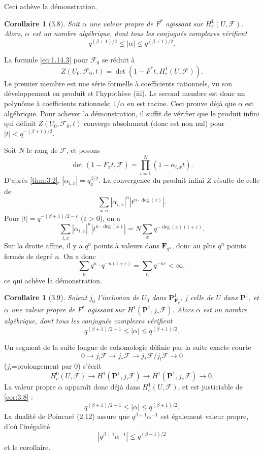 \documentclass[12pt,a4paper]{amsart}
\theoremstyle{plain}
\newtheorem{corollaire}[theoreme]{Corollaire}
\theoremstyle{definition}
\theoremstyle{remark}
\newcommand{\F}{\mathbf{F}}
\numberwithin{equation}{section}
\begin{document}
Ceci ach\`eve la d\'emonstration.

\begin{corollaire}[3.8]\label{cor:3.8}
Soit $\alpha$ une valeur propre de $F^*$ agissant sur $H^1_c(U,\mathscr{F})$. Alors, $\alpha$ est un nombre alg\'ebrique, dont tous les conjugu\'es complexes v\'erifient
\[
q^{(\beta+1)/2} \le |\alpha| \le q^{(\beta+1)/2}.
\]
\end{corollaire}

La formule \eqref{eq:1.14.3} pour $\mathscr{F}_0$ se r\'eduit \`a
\[
Z(U_0,\mathscr{F}_0,t) = \det(1-F^*t,H^1_c(U,\mathscr{F})).
\]
Le premier membre est une s\'erie formelle \`a coefficients rationnels, vu son d\'eveloppement en produit et l'hypoth\`ese (iii). Le second membre est donc un polyn\^ome \`a coefficients rationnels; $1/\alpha$ en est racine. Ceci prouve d\'ej\`a que $\alpha$ est alg\'ebrique. Pour achever la d\'emonstration, il suffit de v\'erifier que le produit infini qui d\'efinit $Z(U_0,\mathscr{F}_0,t)$ converge absolument (donc est non nul) pour $|t|<q^{-(\beta+1)/2}$.

Soit $N$ le rang de $\mathscr{F}$, et posons
\[
\det(1-F_x t,\mathscr{F}) = \prod_{i=1}^N (1-\alpha_{i,x}t).
\]
D'apr\`es \eqref{thm:3.2}, $|\alpha_{i,x}|=q_x^{\beta/2}$. La convergence du produit infini $Z$ r\'esulte de celle de
\[
\sum_{x,n} |\alpha_{i,x}|^n |t^{n\cdot\deg(x)}|.
\]
Pour $|t|=q^{-(\beta+1)/2-\varepsilon}$ ($\varepsilon>0$), on a
\[
\sum_{i,x} |\alpha_{i,x}|^n |t^{n\cdot\deg(x)}| = N\sum_x q^{-\deg(x)(1+\varepsilon)}.
\]
Sur la droite affine, il y a $q^n$ points \`a valeurs dans $\F_{q^n}$, donc au plus $q^n$ points ferm\'es de degr\'e $n$. On a donc
\[
\sum_n q^n \cdot q^{-n(1+\varepsilon)} = \sum_n q^{-n\varepsilon} < \infty,
\]
ce qui ach\`eve la d\'emonstration.

\begin{corollaire}[3.9]\label{cor:3.9}
Soient $j_0$ l'inclusion de $U_0$ dans $\mathbf{P}^1_{\F_q}$, $j$ celle de $U$ dans $\mathbf{P}^1$, et $\alpha$ une valeur propre de $F^*$ agissant sur $H^1(\mathbf{P}^1,j_\ast\mathscr{F})$. Alors $\alpha$ est un nombre alg\'ebrique, dont tous les conjugu\'es complexes v\'erifient
\[
q^{(\beta+1)/2-1} \le |\alpha| \le q^{(\beta+1)/2}.
\]
\end{corollaire}

Un segment de la suite longue de cohomologie d\'efinie par la suite exacte courte
\[
0 \longrightarrow j_!\mathscr{F} \longrightarrow j_\ast\mathscr{F} \longrightarrow j_\ast\mathscr{F}/j_!\mathscr{F} \longrightarrow 0
\]
($j_!$=prolongement par $0$) s'\'ecrit
\[
H^0_c(U,\mathscr{F}) \longrightarrow H^1(\mathbf{P}^1,j_!\mathscr{F}) \longrightarrow H^1(\mathbf{P}^1,j_\ast\mathscr{F}) \longrightarrow 0.
\]
La valeur propre $\alpha$ appara\^it donc d\'ej\`a dans $H^1_c(U,\mathscr{F})$, et est justiciable de \eqref{cor:3.8} :
\[
q^{(\beta+1)/2-1} \le |\alpha| \le q^{(\beta+1)/2}.
\]
La dualit\'e de Poincar\'e (2.12) assure que $q^{\beta+1}\alpha^{-1}$ est \'egalement valeur propre, d'o\`u l'in\'egalit\'e
\[
|q^{\beta+1}\alpha^{-1}| \le q^{(\beta+1)/2}
\]
et le corollaire.
\end{document}
